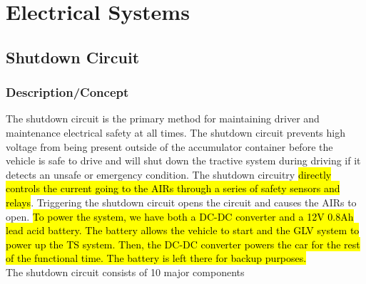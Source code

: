 \documentclass{article}
\DeclareRobustCommand{\hlr}[1]{{\sethlcolor{red}\hl{#1}}}
\begin{document}
\newpage

\section{Electrical Systems}

    \subsection{Shutdown Circuit}

        \subsubsection{Description/Concept}

            The shutdown circuit is the primary method for maintaining driver and maintenance electrical safety at all times. The shutdown circuit prevents high voltage from being present outside of the accumulator container before the vehicle is safe to drive and will shut down the tractive system during driving if it detects an unsafe or emergency condition. The shutdown circuitry \hlr{directly controls the current going to the AIRs through a series of safety sensors and relays}. Triggering the shutdown circuit opens the circuit and causes the AIRs to open. \hlr{To power the system, we have both a DC-DC converter and a 12V 0.8Ah lead acid battery. The battery allows the vehicle to start and the GLV system to power up the TS system. Then, the DC-DC converter powers the car for the rest of the functional time. The battery is left there for backup purposes. }\\

            The shutdown circuit consists of 10 major components
\end{document}
